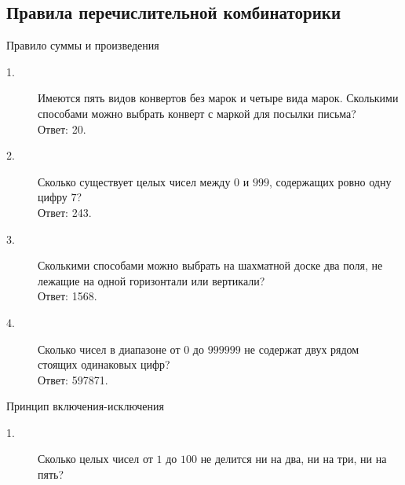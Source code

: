 \documentclass[a4paper,12pt]{article}
\theoremstyle{plain}
\theoremstyle{definition}
\theoremstyle{remark}
\newcommand{\nl}{\\ \indent}
\begin{document}
\subsection*{Правила перечислительной комбинаторики}
\begin{center}
Правило суммы и произведения
\end{center}
\begin{description}
\item[1.] 
Имеются пять видов конвертов без марок и 
четыре вида марок. 
Сколькими способами можно выбрать конверт с маркой 
для посылки письма?
\nl
{\tiny Ответ: 20.}
\item[2.] 
Сколько существует целых чисел между $0$ и $999$,  
содержащих ровно одну цифру $7$?
\nl
{\tiny Ответ: 243.}
\item[3.]
Сколькими способами можно выбрать на шахматной доске два поля, 
не лежащие на одной горизонтали или вертикали?
\nl
{\tiny Ответ: 1568.}
\item[4.]
Сколько чисел в диапазоне от $0$ до $999999$ не содержат 
двух рядом стоящих одинаковых цифр?
\nl
{\tiny Ответ: 597871.}
\end{description}
\begin{center}
Принцип включения-исключения
\end{center}
\begin{description}
\item[1.] Сколько целых чисел от 
$1$ до $100$ не делится ни на два, ни на три, ни на пять?

\end{description}
\end{document}
